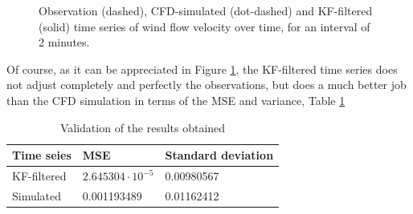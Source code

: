 \documentclass{article}
\theoremstyle{definition}
\theoremstyle{definition}
\theoremstyle{remark}
\theoremstyle{mythmstyle}
\begin{document}
\begin{figure}[!ht]
  \centering
  \caption{Observation (dashed), CFD-simulated (dot-dashed) and KF-filtered (solid) time series of wind flow velocity over time, for an interval of 2 minutes.}
  \label{fig:implem}
\end{figure}

Of course, as it can be appreciated in Figure \ref{fig:implem}, the KF-filtered time series does not adjust completely and perfectly the observations, but does a much better job than the CFD simulation in terms of the MSE and variance, Table \ref{table}%

\begin{table}
   \caption{Validation of the results obtained}
   \label{table}
   \centering
   \begin{tabular}{lll}
     \toprule
     Time seies     & MSE     & Standard deviation \\
     \midrule
     KF-filtered & $2.645304\cdot 10^{-5}$  & 0.00980567     \\
     Simulated     & 0.001193489 & 0.01162412    \\
     \bottomrule
   \end{tabular}
 \end{table}

\end{document}
